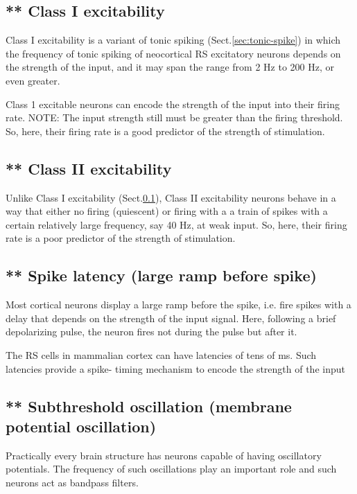 \subsection{** Class I excitability}
\label{sec:Class-I-excitability}


Class I excitability is a variant of tonic spiking (Sect.\ref{sec:tonic-spike})
in which the frequency of tonic spiking of neocortical RS excitatory
neurons depends on the strength of the input, and it may span 
the range from 2 Hz to 200 Hz, or even greater.

Class 1 excitable neurons can encode the strength of the input into
their firing rate. NOTE: The input strength still must be greater than the
firing threshold. 
So, here, their firing rate is a good predictor of the strength of
stimulation.

\subsection{** Class II excitability}
\label{sec:Class-II-excitability}


Unlike Class I excitability (Sect.\ref{sec:Class-I-excitability}), 
Class II excitability neurons behave in a way that either no firing
(quiescent) or firing with a a train of spikes with a certain
relatively large frequency, say 40 Hz, at weak input.
So, here, their firing rate is a poor predictor of the strength of
stimulation.

 
\subsection{** Spike latency (large ramp before spike)}
\label{sec:spike-latency}

Most cortical neurons display a large ramp before the spike, i.e. 
fire spikes with a delay that depends on the strength of the input signal.
Here, following a brief depolarizing pulse, the neuron fires not during the
pulse but after it.

The RS cells in mammalian cortex can have latencies of tens of ms. Such
latencies provide a spike- timing mechanism to encode the strength of the input


\subsection{** Subthreshold oscillation (membrane potential oscillation)}
\label{sec:subthreshold-scillation}

Practically every brain structure has neurons capable of having oscillatory
potentials. The frequency of such oscillations play an important role and such
neurons act as bandpass filters.

